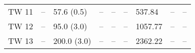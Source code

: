 \begin{tabular}{lllllllll}
TW 11 &                -- &            57.6 (0.5) &                 -- &          -- &                      -- &                      537.84 &                       -- &          -- \\
TW 12 &                -- &            95.0 (3.0) &                 -- &          -- &                      -- &                     1057.77 &                       -- &          -- \\
TW 13 &                -- &           200.0 (3.0) &                 -- &          -- &                      -- &                     2362.22 &                       -- &          -- \\
\bottomrule
\end{tabular}
